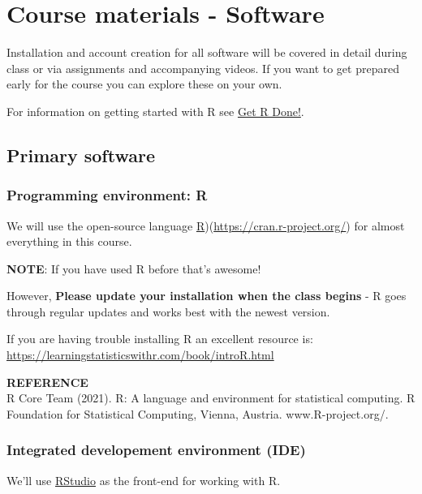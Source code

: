 \documentclass[
]{book}
\begin{document}
\hypertarget{course-materials---software}{%
\chapter{Course materials - Software}\label{course-materials---software}}

Installation and account creation for all software will be covered in detail during class or via assignments and accompanying videos. If you want to get prepared early for the course you can explore these on your own.

For information on getting started with R see \href{https://brouwern.github.io/getRdone/}{Get R Done!}.

\hypertarget{primary-software}{%
\section{Primary software}\label{primary-software}}

\hypertarget{programming-environment-r}{%
\subsection{Programming environment: R}\label{programming-environment-r}}

We will use the open-source language \protect\hyperlink{r}{R})(\url{https://cran.r-project.org/}) for almost everything in this course.

\textbf{NOTE}: If you have used R before that's awesome!

However, \textbf{Please update your installation when the class begins} - R goes through regular updates and works best with the newest version.

If you are having trouble installing R an excellent resource is:
\url{https://learningstatisticswithr.com/book/introR.html}

\textbf{REFERENCE}\\
R Core Team (2021). R: A language and environment for statistical computing. R Foundation for Statistical Computing, Vienna, Austria. www.R-project.org/.

\hypertarget{integrated-developement-environment-ide}{%
\subsection{Integrated developement environment (IDE)}\label{integrated-developement-environment-ide}}

We'll use \href{https://www.rstudio.com/}{RStudio} as the front-end for working with R.
\end{document}
